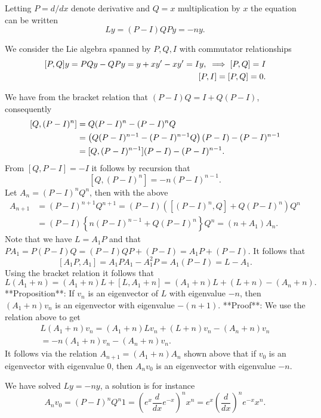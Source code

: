 Letting $P = d/dx$ denote derivative and $Q = x$ multiplication by $x$ the equation can be written
$$
  L y = (P-I)QP y = -n y.
$$

We consider the Lie algebra spanned by $P, Q, I$ with commutator relationships
$$
  \begin{aligned}
    \relax [P, Q]y = PQy - QPy = y + xy' - xy' = I y, \; \implies [P, Q] = I \\
    [P, I] = [P,Q] = 0.
  \end{aligned}
$$

We have from the bracket relation that $(P-I)Q=I+Q(P-I)$, consequently
$$
  \begin{aligned}
    \relax [Q, (P-I)^n] & = Q (P-I)^n - (P-I)^n Q                                            \\
                        & = \left( Q (P-I)^{n-1} - (P-I)^{n-1} Q \right) (P-I) - (P-I)^{n-1} \\
                        & = [Q, (P-I)^{n-1}] (P-I) - (P-I)^{n-1}.
  \end{aligned}
$$
From $[Q, P-I]=-I$ it follows by recursion that
$$
  [Q, (P-I)^n] = -n (P-I)^{n-1}.
$$
Let $A_n = (P-I)^nQ^n$, then with the above
$$
  \begin{aligned}
    A_{n+1} & = (P-I)^{n+1} Q^{n+1} = (P-I) \left( [(P-I)^n, Q] + Q (P-I)^n \right) Q^n \\
            & = (P-I) \left\{ n (P-I)^{n-1} + Q (P-I)^n \right\} Q^n = (n+A_1) A_n.
  \end{aligned}
$$
Note that we have $L = A_1 P$ and that $P A_1 = P(P-I)Q = (P-I)QP + (P-I)=A_1P + (P-I)$. It follows that
$$
  [A_1 P, A_1] = A_1 P A_1 - A_1^2 P= A_1 (P-I)=L - A_1.
$$
Using the bracket relation it follows that
$$
  L (A_1 + n) = (A_1+n)L + [L, A_1+n] = (A_1+n)L + (L + n) - (A_n + n).
$$
**Proposition**: If $v_n$ is an eigenvector of $L$ with eigenvalue $-n$, then $(A_1 +n) v_n$ is an eigenvector with eigenvalue $-(n+1)$.
**Proof**: We use the relation above to get
$$
  \begin{aligned}
    L (A_1+n) v_n = (A_1 + n) L v_n + (L+n) v_n - (A_n + n) v_n \\
    = -n (A_1+n) v_n - (A_n + n) v_n.
  \end{aligned}
$$
It follows via the relation $A_{n+1} = (A_1 + n) A_n$ shown above that if $v_0$ is an eigenvector with eigenvalue $0$, then $A_n v_0$ is an eigenvector with eigenvalue $-n$.

We have solved $L  y = -n y$, a solution is for instance
$$
  A_n v_0 = (P-I)^n Q^n 1 = \left(e^x \frac{d}{dx} e^{-x} \right)^n x^n = e^x \left(\frac{d}{dx} \right)^n  e^{-x} x^n.
$$

